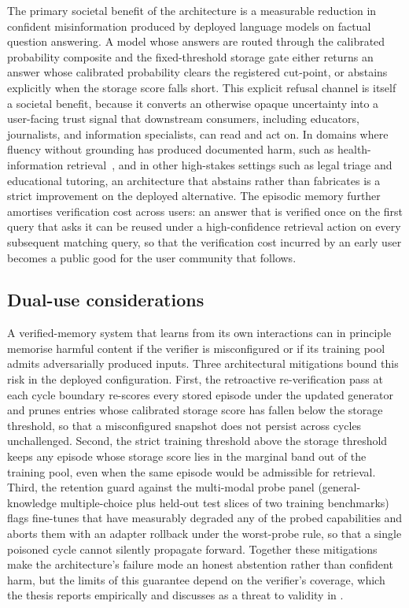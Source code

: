 The primary societal benefit of the architecture is a measurable reduction in confident misinformation produced by deployed language models on factual question answering. A model whose answers are routed through the calibrated probability composite and the fixed-threshold storage gate either returns an answer whose calibrated probability clears the registered cut-point, or abstains explicitly when the storage score falls short. This explicit refusal channel is itself a societal benefit, because it converts an otherwise opaque uncertainty into a user-facing trust signal that downstream consumers, including educators, journalists, and information specialists, can read and act on. In domains where fluency without grounding has produced documented harm, such as health-information retrieval~\cite{alkaissi2023artificial,info:doi/10.2196/53164}, and in other high-stakes settings such as legal triage and educational tutoring, an architecture that abstains rather than fabricates is a strict improvement on the deployed alternative. The episodic memory further amortises verification cost across users: an answer that is verified once on the first query that asks it can be reused under a high-confidence retrieval action on every subsequent matching query, so that the verification cost incurred by an early user becomes a public good for the user community that follows.

\subsection{Dual-use considerations}
\label{sec:soc-dual-use}

A verified-memory system that learns from its own interactions can in principle memorise harmful content if the verifier is misconfigured or if its training pool admits adversarially produced inputs. Three architectural mitigations bound this risk in the deployed configuration. First, the retroactive re-verification pass at each cycle boundary re-scores every stored episode under the updated generator and prunes entries whose calibrated storage score has fallen below the storage threshold, so that a misconfigured snapshot does not persist across cycles unchallenged. Second, the strict training threshold above the storage threshold keeps any episode whose storage score lies in the marginal band out of the training pool, even when the same episode would be admissible for retrieval. Third, the retention guard against the multi-modal probe panel (general-knowledge multiple-choice plus held-out test slices of two training benchmarks) flags fine-tunes that have measurably degraded any of the probed capabilities and aborts them with an adapter rollback under the worst-probe rule, so that a single poisoned cycle cannot silently propagate forward. Together these mitigations make the architecture's failure mode an honest abstention rather than confident harm, but the limits of this guarantee depend on the verifier's coverage, which the thesis reports empirically and discusses as a threat to validity in .

